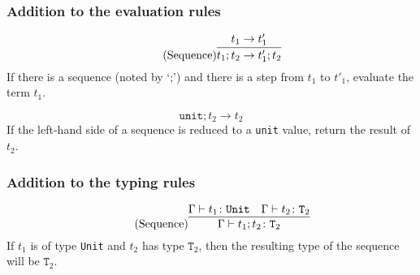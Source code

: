 \subsubsection{Addition to the evaluation rules \cite{pierce2002ProgLang}}
\begin{equation*}
    \tag{Sequence}
    \infer{
        t_1 ; t_2 \rightarrow t'_1 ; t_2
    }{
        t_1 \rightarrow t'_1
    }
\end{equation*}
If there is a sequence (noted by `;') and there is a step from $t_1$ to
$t'_1$, evaluate the term $t_1$.

\begin{equation*}
    \tag{Sequence Next}
    \texttt{unit} ; t_2 \rightarrow t_2
\end{equation*}
If the left-hand side of a sequence is reduced to a \texttt{unit} value,
return the result of $t_2$.

\subsubsection{Addition to the typing rules \cite{pierce2002ProgLang}}
\begin{equation*}
    \tag{Sequence}
    \infer{
        \Gamma \vdash t_1 ; t_2 \colon \texttt{T}_2
    }{
        \Gamma \vdash t_1 \colon \texttt{Unit} & \Gamma \vdash t_2 \colon \texttt{T}_2
    }
\end{equation*}
If $t_1$ is of type \texttt{Unit} and $t_2$ has type $\texttt{T}_2$, then
the resulting type of the sequence will be $\texttt{T}_2$.
